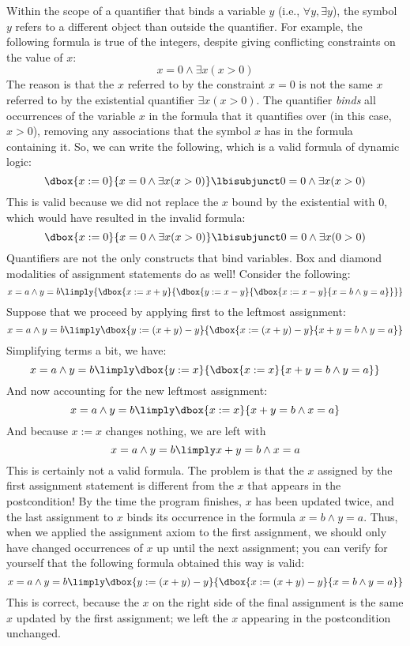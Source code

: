 \documentclass[11pt,twoside]{scrartcl}
\begin{document}
Within the scope of a quantifier that binds a variable $y$ (i.e., $\forall y, \exists y$), the symbol $y$ refers to a different object than outside the quantifier.
For example, the following formula is true of the integers, despite giving conflicting constraints on the value of $x$:
\[
x = 0 \land \exists x (x > 0)
\]
The reason is that the $x$ referred to by the constraint $x = 0$ is not the same $x$ referred to by the existential quantifier $\exists x (x > 0)$. 
The quantifier \emph{binds} all occurrences of the variable $x$ in the formula that it quantifies over (in this case, $x > 0$), removing any associations that the symbol $x$ has in the formula containing it.
So, we can write the following, which is a valid formula of dynamic logic:
\[
\dbox{x := 0}{x = 0 \land \exists x (x > 0)} \lbisubjunct 0 = 0 \land \exists x (x > 0)
\]
This is valid because we did not replace the $x$ bound by the existential with 0, which would have resulted in the invalid formula:
\[
\dbox{x := 0}{x = 0 \land \exists x (x > 0)} \lbisubjunct 0 = 0 \land \exists x (0 > 0)
\]
Quantifiers are not the only constructs that bind variables.
Box and diamond modalities of assignment statements do as well!
Consider the following:
\[
x = a \land y = b \limply {\dbox{x := x + y}{\dbox{y := x - y}{\dbox{x := x - y}{x = b \land y = a}}}}
\]
Suppose that we proceed by applying  first to the leftmost assignment:
\[
x = a \land y = b \limply \dbox{y := (x+y) - y}{\dbox{x := (x+y) - y}{x+y = b \land y = a}}
\]
Simplifying terms a bit, we have:
\[
x = a \land y = b \limply \dbox{y := x}{\dbox{x := x}{x+y = b \land y = a}}
\]
And now accounting for the new leftmost assignment:
\[
x = a \land y = b \limply \dbox{x := x}{x+y = b \land x = a}
\]
And because $x := x$ changes nothing, we are left with
\[
x = a \land y = b \limply x+y = b \land x = a
\]
This is certainly not a valid formula.
The problem is that the $x$ assigned by the first assignment statement is different from the $x$ that appears in the postcondition!
By the time the program finishes, $x$ has been updated twice, and the last assignment to $x$ binds its occurrence in the formula $x = b \land y = a$.
Thus, when we applied the assignment axiom to the first assignment, we should only have changed occurrences of $x$ up until the next assignment; you can verify for yourself that the following formula obtained this way is valid:
\[
x = a \land y = b \limply \dbox{y := (x+y) - y}{\dbox{x := (x+y) - y}{x = b \land y = a}}
\]
This is correct, because the $x$ on the right side of the final assignment is the same $x$ updated by the first assignment; we left the $x$ appearing in the postcondition unchanged.
\end{document}
